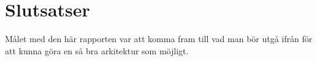 \section{Slutsatser}
Målet med den här rapporten var att komma fram till vad man bör utgå ifrån för att kunna göra en så bra arkitektur som möjligt.

